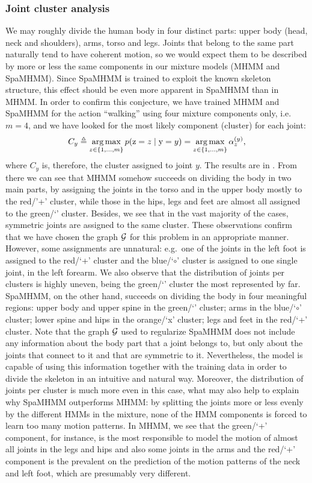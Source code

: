 \subsubsection{Joint cluster analysis}
\label{sec:spamhmm_cluster}
We may roughly divide the human body in four distinct parts: upper body (head, neck and shoulders), arms, torso and legs. Joints that belong to the same part naturally tend to have coherent motion, so we would expect them to be described by more or less the same components in our mixture models (MHMM and SpaMHMM). Since SpaMHMM is trained to exploit the known skeleton structure, this effect should be even more apparent in SpaMHMM than in MHMM. In order to confirm this conjecture, we have trained MHMM and SpaMHMM for the action ``walking'' using four mixture components only, i.e.\ $m=4$, and we have looked for the most likely component (cluster) for each joint:
\begin{equation}
C_y \triangleq \operatorname*{arg\,max}_{z \in \{1,\dots,m\}} p({\textnormal{z}}=z \mid {\textnormal{y}}=y) = \operatorname*{arg\,max}_{z \in \{1,\dots,m\}} {\alpha}^{(y)}_z,
\end{equation}
where $C_y$ is, therefore, the cluster assigned to joint $y$. The results are in . From there we can see that MHMM somehow succeeds on dividing the body in two main parts, by assigning the joints in the torso and in the upper body mostly to the red/'+' cluster, while those in the hips, legs and feet are almost all assigned to the green/`\SmallTriangleUp' cluster. Besides, we see that in the vast majority of the cases, symmetric joints are assigned to the same cluster. These observations confirm that we have chosen the graph ${\mathcal{G}}$ for this problem in an appropriate manner. However, some assignments are unnatural: e.g.\  one of the joints in the left foot is assigned to the red/`+' cluster and the blue/`$\circ$' cluster is assigned to one single joint, in the left forearm. We also observe that the distribution of joints per clusters is highly uneven, being the green/`\SmallTriangleUp' cluster the most represented by far. SpaMHMM, on the other hand, succeeds on dividing the body in four meaningful regions: upper body and upper spine in the green/`\SmallTriangleUp' cluster; arms in the blue/`$\circ$' cluster; lower spine and hips in the orange/`x' cluster; legs and feet in the red/`+' cluster. Note that the graph ${\mathcal{G}}$ used to regularize SpaMHMM does not include any information about the body part that a joint belongs to, but only about the joints that connect to it and that are symmetric to it. Nevertheless, the model is capable of using this information together with the training data in order to divide the skeleton in an intuitive and natural way. Moreover, the distribution of joints per cluster is much more even in this case, what may also help to explain why SpaMHMM outperforms MHMM: by splitting the joints more or less evenly by the different HMMs in the mixture, none of the HMM components is forced to learn too many motion patterns. In MHMM, we see that the green/`+' component, for instance, is the most responsible to model the motion of almost all joints in the legs and hips and also some joints in the arms and the red/`+' component is the prevalent on the prediction of the motion patterns of the neck and left foot, which are presumably very different.

